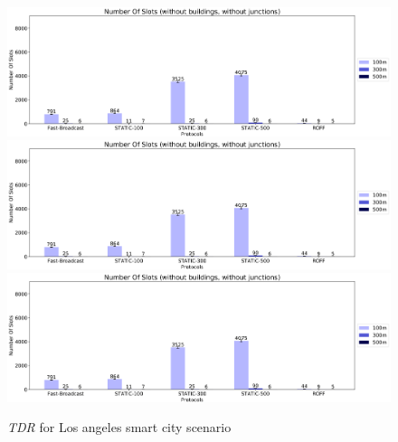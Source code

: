 	\begin{figure}[H]
		\centering
		\includegraphics[width=1.0\textwidth]{immagini/la-smart-city/b0/nos}
		\includegraphics[width=1.0\textwidth]{immagini/la-smart-city/b1/h0/nos}
		\includegraphics[width=1.0\textwidth]{immagini/la-smart-city/b1//h1/nos}
		\caption{\textit{TDR} for Los angeles smart city scenario}
		\label{fig:la-smart-city-nos}
	\end{figure}

